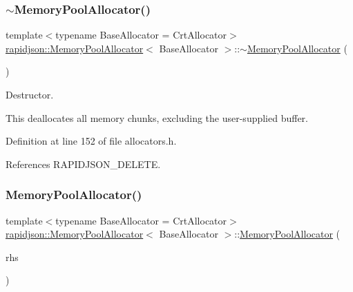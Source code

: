 \subsubsection{\texorpdfstring{$\sim$MemoryPoolAllocator()}{~MemoryPoolAllocator()}}
{\footnotesize\ttfamily template$<$typename Base\+Allocator = Crt\+Allocator$>$ \\
\mbox{\hyperlink{classrapidjson_1_1_memory_pool_allocator}{rapidjson\+::\+Memory\+Pool\+Allocator}}$<$ Base\+Allocator $>$\+::$\sim$\mbox{\hyperlink{classrapidjson_1_1_memory_pool_allocator}{Memory\+Pool\+Allocator}} (\begin{DoxyParamCaption}{ }\end{DoxyParamCaption})}



Destructor. 

This deallocates all memory chunks, excluding the user-\/supplied buffer. 

Definition at line 152 of file allocators.\+h.


\begin{DoxyCode}{0}

\end{DoxyCode}


References R\+A\+P\+I\+D\+J\+S\+O\+N\+\_\+\+D\+E\+L\+E\+TE.

\mbox{\label{classrapidjson_1_1_memory_pool_allocator_a7aebc93e8dc47971bb3f2e4e50677912}} 
\subsubsection{\texorpdfstring{MemoryPoolAllocator()}{MemoryPoolAllocator()}\hspace{0.1cm}{\footnotesize\ttfamily [3/3]}}
{\footnotesize\ttfamily template$<$typename Base\+Allocator = Crt\+Allocator$>$ \\
\mbox{\hyperlink{classrapidjson_1_1_memory_pool_allocator}{rapidjson\+::\+Memory\+Pool\+Allocator}}$<$ Base\+Allocator $>$\+::\mbox{\hyperlink{classrapidjson_1_1_memory_pool_allocator}{Memory\+Pool\+Allocator}} (\begin{DoxyParamCaption}\item[{const \mbox{\hyperlink{classrapidjson_1_1_memory_pool_allocator}{Memory\+Pool\+Allocator}}$<$ Base\+Allocator $>$ \&}]{rhs }\end{DoxyParamCaption})\hspace{0.3cm}{\ttfamily [private]}}




